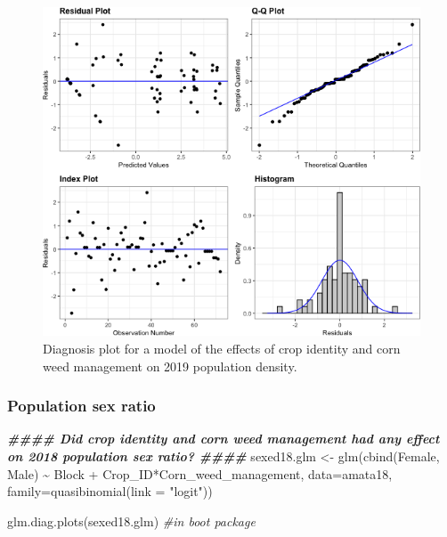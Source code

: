 \documentclass[
]{article}
\newenvironment{Shaded}{\begin{snugshade}}{\end{snugshade}}
\newcommand{\AttributeTok}[1]{\textcolor[rgb]{0.77,0.63,0.00}{#1}}
\newcommand{\CommentTok}[1]{\textcolor[rgb]{0.56,0.35,0.01}{\textit{#1}}}
\newcommand{\DocumentationTok}[1]{\textcolor[rgb]{0.56,0.35,0.01}{\textbf{\textit{#1}}}}
\newcommand{\FunctionTok}[1]{\textcolor[rgb]{0.00,0.00,0.00}{#1}}
\newcommand{\NormalTok}[1]{#1}
\newcommand{\OtherTok}[1]{\textcolor[rgb]{0.56,0.35,0.01}{#1}}
\newcommand{\SpecialCharTok}[1]{\textcolor[rgb]{0.00,0.00,0.00}{#1}}
\newcommand{\StringTok}[1]{\textcolor[rgb]{0.31,0.60,0.02}{#1}}
\begin{document}
\begin{figure}
\includegraphics[width=1\linewidth]{AppendixC_model_diagnosis_files/figure-latex/pop-dens-19-1} \caption{Diagnosis plot for a model of the effects of crop identity and corn weed management on 2019 population density.}\label{fig:pop-dens-19}
\end{figure}

\hypertarget{population-sex-ratio}{%
\subsubsection*{Population sex ratio}\label{population-sex-ratio}}

\begin{Shaded}
\begin{Highlighting}[]
\DocumentationTok{\#\#\#\# Did crop identity and corn weed management had any effect on 2018 population sex ratio? \#\#\#\#}
\NormalTok{sexed18.glm }\OtherTok{\textless{}{-}} \FunctionTok{glm}\NormalTok{(}\FunctionTok{cbind}\NormalTok{(Female, Male) }\SpecialCharTok{\textasciitilde{}}\NormalTok{ Block }\SpecialCharTok{+}\NormalTok{ Crop\_ID}\SpecialCharTok{*}\NormalTok{Corn\_weed\_management,}
  \AttributeTok{data=}\NormalTok{amata18, }\AttributeTok{family=}\FunctionTok{quasibinomial}\NormalTok{(}\AttributeTok{link =} \StringTok{"logit"}\NormalTok{))}

\FunctionTok{glm.diag.plots}\NormalTok{(sexed18.glm) }\CommentTok{\#in boot package}
\end{Highlighting}
\end{Shaded}
\end{document}
